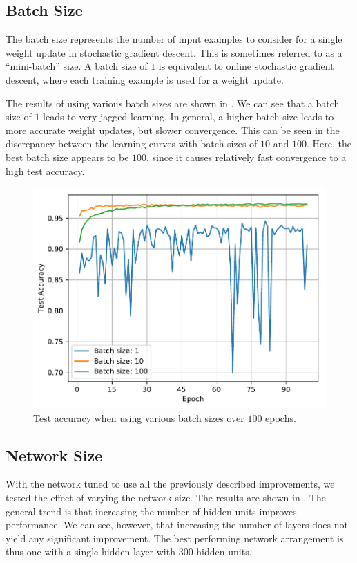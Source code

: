 \documentclass[journal,hidelinks]{IEEEtran}
\begin{document}
\subsection{Batch Size}

The batch size represents the number of input examples to consider for a single weight update in stochastic gradient descent. This is sometimes referred to as a ``mini-batch'' size. A batch size of $1$ is equivalent to online stochastic gradient descent, where each training example is used for a weight update.

The results of using various batch sizes are shown in . We can see that a batch size of $1$ leads to very jagged learning. In general, a higher batch size leads to more accurate weight updates, but slower convergence. This can be seen in the discrepancy between the learning curves with batch sizes of $10$ and $100$. Here, the best batch size appears to be $100$, since it causes relatively fast convergence to a high test accuracy.

\begin{figure}[!htb]
  \centering
  \includegraphics[width=0.8\columnwidth]{plots/batch_size_zoom.pdf}
  \caption{Test accuracy when using various batch sizes over $100$ epochs.}
  \label{fig:batch_size}
\end{figure}

\subsection{Network Size}

With the network tuned to use all the previously described improvements, we tested the effect of varying the network size. The results are shown in . The general trend is that increasing the number of hidden units improves performance. We can see, however, that increasing the number of layers does not yield any significant improvement. The best performing network arrangement is thus one with a single hidden layer with $300$ hidden units.
\end{document}
